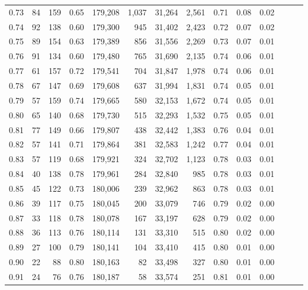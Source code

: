 \begin{tabular}{rrrrrrrrrrrrrr}
0.73 &      84 &  159 &  0.65 &  179,208 &    1,037 &  31,264 &   2,561 &  0.71 &  0.08 &      0.02 \\
0.74 &      92 &  138 &  0.60 &  179,300 &      945 &  31,402 &   2,423 &  0.72 &  0.07 &      0.02 \\
0.75 &      89 &  154 &  0.63 &  179,389 &      856 &  31,556 &   2,269 &  0.73 &  0.07 &      0.01 \\
0.76 &      91 &  134 &  0.60 &  179,480 &      765 &  31,690 &   2,135 &  0.74 &  0.06 &      0.01 \\
0.77 &      61 &  157 &  0.72 &  179,541 &      704 &  31,847 &   1,978 &  0.74 &  0.06 &      0.01 \\
0.78 &      67 &  147 &  0.69 &  179,608 &      637 &  31,994 &   1,831 &  0.74 &  0.05 &      0.01 \\
0.79 &      57 &  159 &  0.74 &  179,665 &      580 &  32,153 &   1,672 &  0.74 &  0.05 &      0.01 \\
0.80 &      65 &  140 &  0.68 &  179,730 &      515 &  32,293 &   1,532 &  0.75 &  0.05 &      0.01 \\
0.81 &      77 &  149 &  0.66 &  179,807 &      438 &  32,442 &   1,383 &  0.76 &  0.04 &      0.01 \\
0.82 &      57 &  141 &  0.71 &  179,864 &      381 &  32,583 &   1,242 &  0.77 &  0.04 &      0.01 \\
0.83 &      57 &  119 &  0.68 &  179,921 &      324 &  32,702 &   1,123 &  0.78 &  0.03 &      0.01 \\
0.84 &      40 &  138 &  0.78 &  179,961 &      284 &  32,840 &     985 &  0.78 &  0.03 &      0.01 \\
0.85 &      45 &  122 &  0.73 &  180,006 &      239 &  32,962 &     863 &  0.78 &  0.03 &      0.01 \\
0.86 &      39 &  117 &  0.75 &  180,045 &      200 &  33,079 &     746 &  0.79 &  0.02 &      0.00 \\
0.87 &      33 &  118 &  0.78 &  180,078 &      167 &  33,197 &     628 &  0.79 &  0.02 &      0.00 \\
0.88 &      36 &  113 &  0.76 &  180,114 &      131 &  33,310 &     515 &  0.80 &  0.02 &      0.00 \\
0.89 &      27 &  100 &  0.79 &  180,141 &      104 &  33,410 &     415 &  0.80 &  0.01 &      0.00 \\
0.90 &      22 &   88 &  0.80 &  180,163 &       82 &  33,498 &     327 &  0.80 &  0.01 &      0.00 \\
0.91 &      24 &   76 &  0.76 &  180,187 &       58 &  33,574 &     251 &  0.81 &  0.01 &      0.00 \\

\end{tabular}
